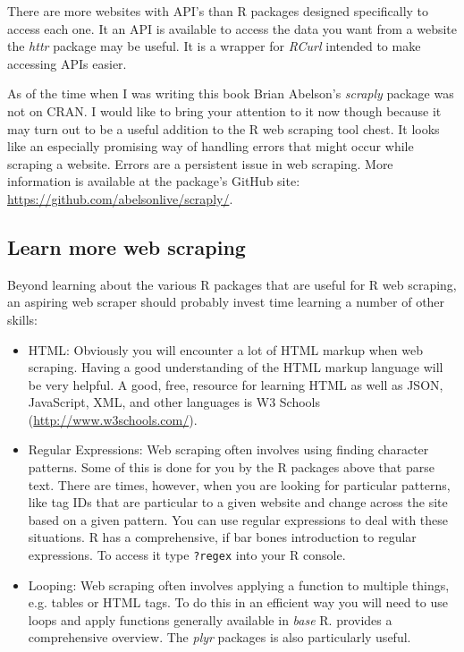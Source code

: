 There are more websites with API's than R packages designed specifically to access each one. It an API is available to access the data you want from a website the \emph{httr} package \citep{R-httr}  may be useful. It is a wrapper for \emph{RCurl} intended to make accessing APIs easier. 

As of the time when I was writing this book Brian Abelson's \emph{scraply}  package was not on CRAN. I would like to bring your attention to it now though because it may turn out to be a useful addition to the R web scraping tool chest. It looks like an especially promising way of handling errors that might occur while scraping a website. Errors are a persistent issue in web scraping. More information is available at the package's GitHub site: \url{https://github.com/abelsonlive/scraply/}.

\subsection{Learn more web scraping}

Beyond learning about the various R packages that are useful for R web scraping, an aspiring web scraper should probably invest time learning a number of other skills:

\begin{itemize}
	\item HTML: Obviously you will encounter a lot of HTML markup when web scraping. Having a good understanding of the HTML markup language will be very helpful. A good, free, resource for learning HTML as well as JSON, JavaScript, XML, and other languages is W3 Schools (\url{http://www.w3schools.com/}).
	\item Regular Expressions: Web scraping often involves using finding character patterns. Some of this is done for you by the R packages above that parse text. There are times, however, when you are looking for particular patterns, like tag IDs that are particular to a given website and change across the site based on a given pattern. You can use regular expressions to deal with these situations. R has a comprehensive, if bar bones introduction to regular expressions. To access it type \verb|?regex| into your R console.
	\item Looping: Web scraping often involves applying a function to multiple things, e.g. tables or HTML tags. To do this in an efficient way you will need to use loops and apply functions generally available in \emph{base} R. \cite{Matloff2011} provides a comprehensive overview. The \emph{plyr} packages \citep{R-plyr} is also particularly useful.
\end{itemize}

